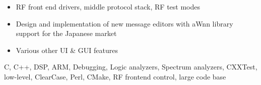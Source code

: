 \begin{experiences}
{\begin{itemize}
                          \item RF front end drivers, middle protocol stack, RF test modes
                          \item Design and implementation of new message editors with aWnn library support for the Japanese market
                          \item Various other UI \& GUI features
                        \end{itemize}
                    }
                    {C, C++, DSP, ARM, Debugging, Logic analyzers, Spectrum analyzers, CXXTest, low-level, ClearCase, Perl, CMake, RF frontend control, large code base}  
\end{experiences}

